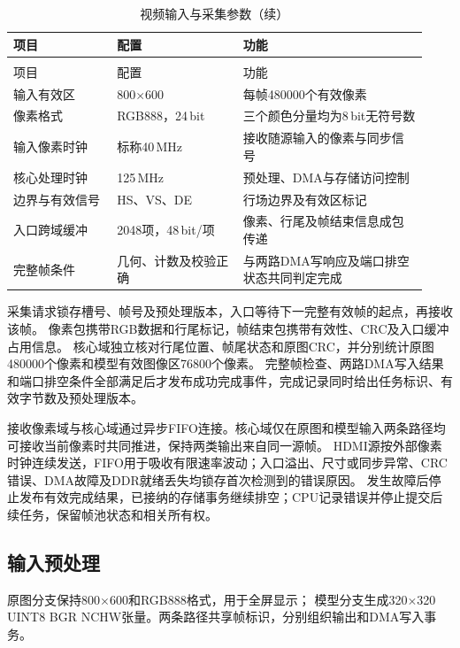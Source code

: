 \begin{reporttable}
\begin{longtable}{@{}p{0.23\linewidth}p{0.29\linewidth}p{0.41\linewidth}@{}}
\caption{视频输入与采集参数}\label{tbl:video-capture-parameters}\\
\toprule
项目 & 配置 & 功能 \\
\midrule
\endfirsthead
\caption[]{视频输入与采集参数（续）}\\
\toprule
项目 & 配置 & 功能 \\
\midrule
\endhead
\bottomrule
\endfoot
输入有效区 & 800$\times$600 & 每帧480000个有效像素 \\
像素格式 & RGB888，24\,bit & 三个颜色分量均为8\,bit无符号数 \\
输入像素时钟 & 标称40\,MHz & 接收随源输入的像素与同步信号 \\
核心处理时钟 & 125\,MHz & 预处理、DMA与存储访问控制 \\
边界与有效信号 & HS、VS、DE & 行场边界及有效区标记 \\
入口跨域缓冲 & 2048项，48\,bit/项 & 像素、行尾及帧结束信息成包传递 \\
完整帧条件 & 几何、计数及校验正确 & 与两路DMA写响应及端口排空状态共同判定完成 \\
\end{longtable}
\end{reporttable}

采集请求锁存槽号、帧号及预处理版本，入口等待下一完整有效帧的起点，再接收该帧。
像素包携带RGB数据和行尾标记，帧结束包携带有效性、CRC及入口缓冲占用信息。
核心域独立核对行尾位置、帧尾状态和原图CRC，并分别统计原图480000个像素和模型有效图像区76800个像素。
完整帧检查、两路DMA写入结果和端口排空条件全部满足后才发布成功完成事件，完成记录同时给出任务标识、有效字节数及预处理版本。

接收像素域与核心域通过异步FIFO连接。核心域仅在原图和模型输入两条路径均可接收当前像素时共同推进，保持两类输出来自同一源帧。
HDMI源按外部像素时钟连续发送，FIFO用于吸收有限速率波动；入口溢出、尺寸或同步异常、CRC错误、DMA故障及DDR就绪丢失均锁存首次检测到的错误原因。
发生故障后停止发布有效完成结果，已接纳的存储事务继续排空；CPU记录错误并停止提交后续任务，保留帧池状态和相关所有权。

\subsection{输入预处理}

原图分支保持800$\times$600和RGB888格式，用于全屏显示；
模型分支生成320$\times$320 UINT8 BGR NCHW张量。两条路径共享帧标识，分别组织输出和DMA写入事务。

